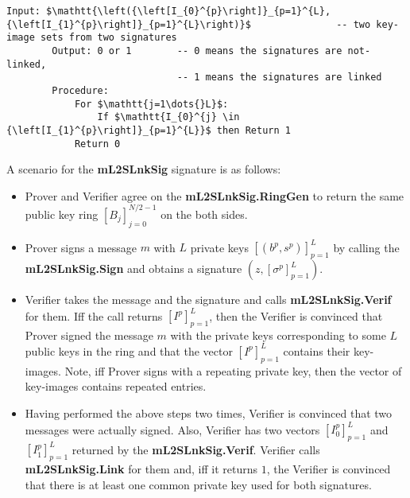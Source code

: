 \documentclass{mathcryptology} %
\theoremstyle{title}
\theoremstyle{titleof}
\begin{document}
\begin{itemize}
        \begin{mdframed}[backgroundcolor=black!10!white]
        \begin{lstlisting}[caption={\textbf{mL2SLnkSig.Link} implementation.},label={Lis:8}]
        Input: $\mathtt{\left({\left[I_{0}^{p}\right]}_{p=1}^{L},{\left[I_{1}^{p}\right]}_{p=1}^{L}\right)}$               -- two key-image sets from two signatures
        Output: 0 or 1        -- 0 means the signatures are not-linked,
                              -- 1 means the signatures are linked
        Procedure:
            For $\mathtt{j=1\dots{}L}$:
                If $\mathtt{I_{0}^{j} \in {\left[I_{1}^{p}\right]}_{p=1}^{L}}$ then Return 1
            Return 0
        \end{lstlisting}
        \end{mdframed}
    \end{itemize}

    A scenario for the \textbf{mL2SLnkSig} signature is as follows:
    \begin{itemize}
        \item Prover and Verifier agree on the \textbf{mL2SLnkSig.RingGen} to return the same public key ring ${\left[B_{j}\right]}_{j=0}^{N/2-1}$ on the both sides.
        \item Prover signs a message $m$ with $L$ private keys ${\left[\left(b^{p}, s^{p}\right)\right]}_{p=1}^{L}$ by calling the \textbf{mL2SLnkSig.Sign} and obtains a signature $\left(z,{\left[\sigma^{p}\right]}_{p=1}^{L}\right)$.
        \item Verifier takes the message and the signature and calls \textbf{mL2SLnkSig.Verif} for them. Iff the call returns ${\left[I^{p}\right]}_{p=1}^{L}$, then the Verifier is convinced that Prover signed the message $m$ with the private keys corresponding to some $L$ public keys in the ring and that the vector ${\left[I^{p}\right]}_{p=1}^{L}$ contains their key-images. Note, iff Prover signs with a repeating private key, then the vector of key-images contains repeated entries.
        \item Having performed the above steps two times, Verifier is convinced that two messages were actually signed. Also, Verifier has two vectors ${\left[I_{0}^{p}\right]}_{p=1}^{L}$ and ${\left[I_{1}^{p}\right]}_{p=1}^{L}$ returned by the \textbf{mL2SLnkSig.Verif}. Verifier calls \textbf{mL2SLnkSig.Link} for them and, iff it returns $1$, the Verifier is convinced that there is at least one common private key used for both signatures.
    \end{itemize}
\end{document}
